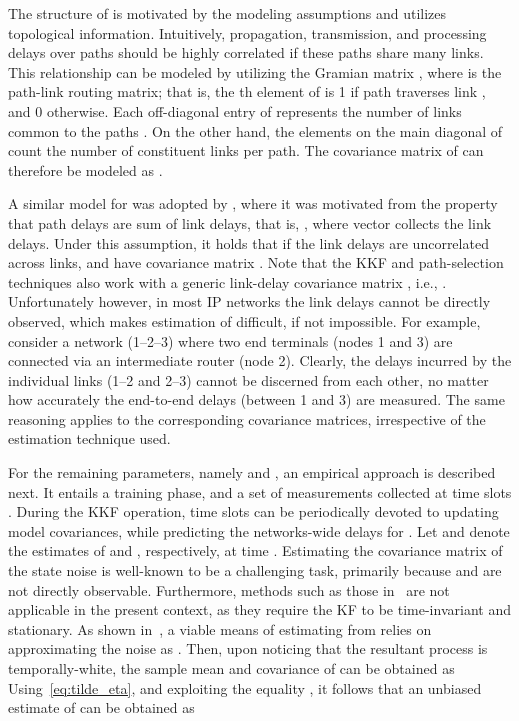 \documentclass[draftcls,onecolumn,12pt]{IEEEtran}
\theoremstyle{plain}\newtheorem{thm}{Theorem}
\theoremstyle{definition}
\theoremstyle{remark}
\begin{document}
The structure of  is motivated by the modeling assumptions and utilizes topological information. 
Intuitively, propagation, transmission, and processing delays over paths  should be highly correlated if these paths share many links. 
This relationship can be modeled by utilizing the Gramian matrix , where  is the  path-link routing matrix; that is, the th element of  is 1 if path  traverses link , and 0 otherwise. 
Each off-diagonal entry  of  represents the number of links common to the paths .
On the other hand, the elements on the main diagonal of  count the number of constituent links per path.
The covariance matrix of  can therefore be modeled as . 

A similar model for  was adopted by \cite{nk}, where it was motivated from the property that path delays are sum of link delays, that is, , where vector  collects the link delays.
Under this assumption, it holds that  if the link delays are uncorrelated across links, and have covariance matrix . 
{ Note that the KKF and path-selection techniques also work with a generic link-delay covariance matrix , i.e., . 
Unfortunately however, in most IP networks the link delays cannot be directly observed, which makes estimation of  difficult, if not impossible.
For example, consider a network (1--2--3) where two end terminals (nodes 1 and 3) are connected via an intermediate router (node 2). Clearly, the delays incurred by the individual links (1--2 and 2--3) cannot be discerned from each other, no matter how accurately the end-to-end delays (between 1 and 3) are measured. 
The same reasoning applies to the corresponding covariance matrices, irrespective of the estimation technique used. }

 
For the remaining parameters, namely  and , an empirical approach is described next. 
It entails a training phase, and a set of measurements  collected at time slots . 
During the KKF operation,  time slots can be periodically devoted to updating model covariances, while predicting the networks-wide delays  for . 
Let  and  denote the estimates of  and , respectively, at time .
Estimating the covariance matrix of the state noise is well-known to be a challenging task, primarily because  and  are not directly observable. 
Furthermore, methods such as those in~\cite{Mehra70} are not applicable in the present context, as they require the KF to be time-invariant and stationary. 
As shown in~\cite{Myers76}, a viable means of estimating  from  relies on approximating the noise  as . 
Then, upon  noticing that the resultant process  is temporally-white, the sample mean and covariance of  can be obtained as 
Using~\eqref{eq:tilde_eta}, and exploiting the equality , it follows that an unbiased estimate of  can be obtained as 
\end{document}
